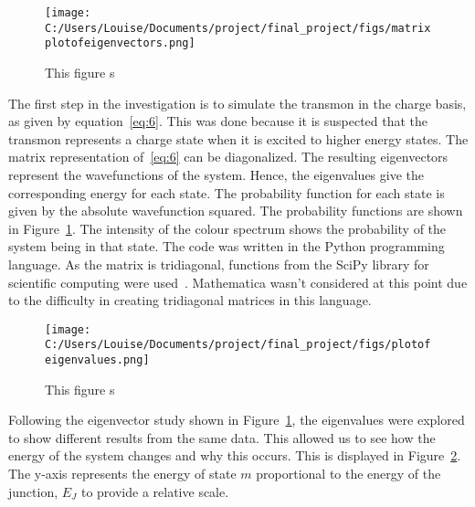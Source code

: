 \documentclass[11pt]{article}
\begin{document}
\begin{figure}[ht]
\centering
\texttt{[image: C:/Users/Louise/Documents/project/final\_project/figs/matrixplotofeigenvectors.png]}
\caption{This figure s}
\label{fig:graph1}
\end{figure}
The first step in the investigation is to simulate the transmon in the charge basis, as given by equation~\ref{eq:6}. This was done because it is suspected that the transmon represents a charge state when it is excited to higher energy states. The matrix representation of~\ref{eq:6} can be diagonalized. The resulting eigenvectors represent the wavefunctions of the system. Hence, the eigenvalues give the corresponding energy for each state. The probability function for each state is given by the absolute wavefunction squared. The probability functions are shown in Figure~\ref{fig:graph1}. The intensity of the colour spectrum shows the probability of the system being in that state. The code was written in the Python programming language. As the matrix is tridiagonal, functions from the SciPy library for scientific computing were used~\cite{jonesSciPyOpenSource2001}. Mathematica wasn't considered at this point due to the difficulty in creating tridiagonal matrices in this language.
\begin{figure}[ht]
\centering
\texttt{[image: C:/Users/Louise/Documents/project/final\_project/figs/plotofeigenvalues.png]}
\caption{This figure s}
\label{fig:graph2}
\end{figure}
Following the eigenvector study shown in Figure~\ref{fig:graph1}, the eigenvalues were explored to show different results from the same data. This allowed us to see how the energy of the system changes and why this occurs. This is displayed in Figure~\ref{fig:graph2}. The y-axis represents the energy of state $m$ proportional to the energy of the junction, $E_J$ to provide a relative scale.
\end{document}
